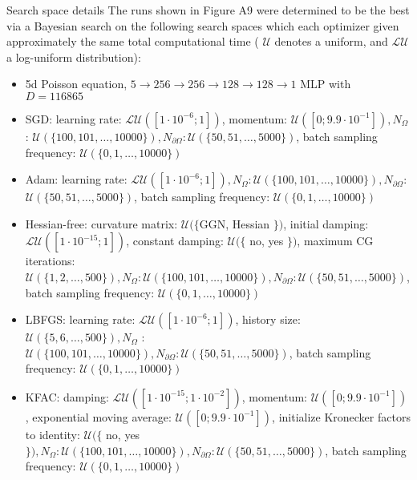 \documentclass[10pt]{article}
\begin{document}
Search space details The runs shown in Figure A9 were determined to be the best via a Bayesian search on the following search spaces which each optimizer given approximately the same total computational time ( $\mathcal{U}$ denotes a uniform, and $\mathcal{L U}$ a log-uniform distribution):

\begin{itemize}
  \item 5d Poisson equation, $5 \rightarrow 256 \rightarrow 256 \rightarrow 128 \rightarrow 128 \rightarrow 1$ MLP with $D=116865$
  \item SGD: learning rate: $\mathcal{L U}\left(\left[1 \cdot 10^{-6} ; 1\right]\right)$, momentum: $\mathcal{U}\left(\left[0 ; 9.9 \cdot 10^{-1}\right]\right), N_{\Omega}$ : $\mathcal{U}(\{100,101, \ldots, 10000\}), N_{\partial \Omega}: \mathcal{U}(\{50,51, \ldots, 5000\})$, batch sampling frequency: $\mathcal{U}(\{0,1, \ldots, 10000\})$
  \item Adam: learning rate: $\mathcal{L U}\left(\left[1 \cdot 10^{-6} ; 1\right]\right), N_{\Omega}: \mathcal{U}(\{100,101, \ldots, 10000\}), N_{\partial \Omega}:$ $\mathcal{U}(\{50,51, \ldots, 5000\})$, batch sampling frequency: $\mathcal{U}(\{0,1, \ldots, 10000\})$
  \item Hessian-free: curvature matrix: $\mathcal{U}(\{\mathrm{GGN}$, Hessian $\})$, initial damping: $\mathcal{L U}\left(\left[1 \cdot 10^{-15} ; 1\right]\right)$, constant damping: $\mathcal{U}(\{$ no, yes $\})$, maximum CG iterations: $\mathcal{U}(\{1,2, \ldots, 500\}), N_{\Omega}: \mathcal{U}(\{100,101, \ldots, 10000\}), N_{\partial \Omega}: \mathcal{U}(\{50,51, \ldots, 5000\})$, batch sampling frequency: $\mathcal{U}(\{0,1, \ldots, 10000\})$
  \item LBFGS: learning rate: $\mathcal{L U}\left(\left[1 \cdot 10^{-6} ; 1\right]\right)$, history size: $\mathcal{U}(\{5,6, \ldots, 500\}), N_{\Omega}$ : $\mathcal{U}(\{100,101, \ldots, 10000\}), N_{\partial \Omega}: \mathcal{U}(\{50,51, \ldots, 5000\})$, batch sampling frequency: $\mathcal{U}(\{0,1, \ldots, 10000\})$
  \item KFAC: damping: $\mathcal{L U}\left(\left[1 \cdot 10^{-15} ; 1 \cdot 10^{-2}\right]\right)$, momentum: $\mathcal{U}\left(\left[0 ; 9.9 \cdot 10^{-1}\right]\right)$, exponential moving average: $\mathcal{U}\left(\left[0 ; 9.9 \cdot 10^{-1}\right]\right)$, initialize Kronecker factors to identity: $\mathcal{U}(\{$ no, yes $\}), N_{\Omega}: \mathcal{U}(\{100,101, \ldots, 10000\}), N_{\partial \Omega}: \mathcal{U}(\{50,51, \ldots, 5000\})$, batch sampling frequency: $\mathcal{U}(\{0,1, \ldots, 10000\})$

\end{itemize}
\end{document}
